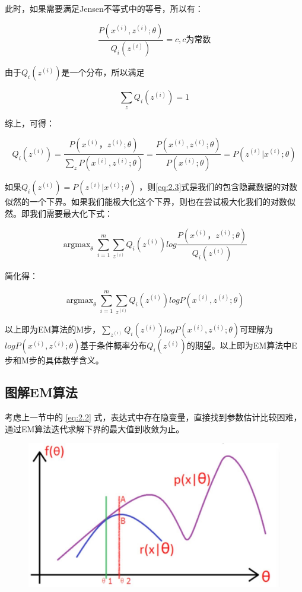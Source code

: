 此时，如果需要满足Jensen不等式中的等号，所以有：

$$
\frac{P(x^{(i)}, z^{(i)};\theta)}{Q_i(z^{(i)})} =c, c为常数
$$

由于$Q_i(z^{(i)})$是一个分布，所以满足

$$
\sum\limits_{z}Q_i(z^{(i)}) =1
$$

综上，可得：

$$
Q_i(z^{(i)})  = \frac{P(x^{(i)}， z^{(i)};\theta)}{\sum\limits_{z}P(x^{(i)}, z^{(i)};\theta)} =  \frac{P(x^{(i)}, z^{(i)};\theta)}{P(x^{(i)};\theta)} = P( z^{(i)}|x^{(i)};\theta)
$$

如果$Q_i(z^{(i)}) = P( z^{(i)}|x^{(i)};\theta)$ ，则\ref{eq:2.3}式是我们的包含隐藏数据的对数似然的一个下界。如果我们能极大化这个下界，则也在尝试极大化我们的对数似然。即我们需要最大化下式：

$$
\mathop{\arg\max}_\theta \sum\limits_{i=1}^m \sum\limits_{z^{(i)}}Q_i(z^{(i)})log\frac{P(x^{(i)}， z^{(i)};\theta)}{Q_i(z^{(i)})}
$$

简化得：

$$
\mathop{\arg\max}_\theta \sum\limits_{i=1}^m \sum\limits_{z^{(i)}}Q_i(z^{(i)})log{P(x^{(i)}, z^{(i)};\theta)}
$$

以上即为EM算法的M步，$\sum\limits_{z^{(i)}}Q_i(z^{(i)})log{P(x^{(i)}, z^{(i)};\theta)}$可理解为$logP(x^{(i)}, z^{(i)};\theta) $基于条件概率分布$Q_i(z^{(i)}) $的期望。以上即为EM算法中E步和M步的具体数学含义。

\subsection{图解EM算法}


考虑上一节中的 \ref{eq:2.2} 式，表达式中存在隐变量，直接找到参数估计比较困难，通过EM算法迭代求解下界的最大值到收敛为止。

 \begin{figure}[h]
   \centering
   \includegraphics[width=.7\textwidth]{imgs/2.20.1.eps}
 \end{figure}

